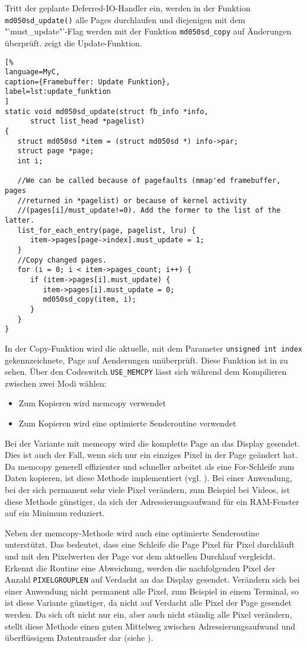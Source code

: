 Tritt der geplante Deferred-IO-Handler ein, werden in der Funktion \lstinline|md050sd_update()| alle Pages durchlaufen und diejenigen mit dem "'must\_update"'-Flag werden mit der Funktion \lstinline|md050sd_copy| auf Änderungen überprüft.
 zeigt die Update-Funktion.
\begin{lstlisting}[%
language=MyC,
caption={Framebuffer: Update Funktion},
label=lst:update_funktion
]
static void md050sd_update(struct fb_info *info,
      struct list_head *pagelist)
{
   struct md050sd *item = (struct md050sd *) info->par;
   struct page *page;
   int i;

   //We can be called because of pagefaults (mmap'ed framebuffer, pages
   //returned in *pagelist) or because of kernel activity
   //(pages[i]/must_update!=0). Add the former to the list of the latter.
   list_for_each_entry(page, pagelist, lru) {
      item->pages[page->index].must_update = 1;
   }
   //Copy changed pages.
   for (i = 0; i < item->pages_count; i++) {
      if (item->pages[i].must_update) {
         item->pages[i].must_update = 0;
         md050sd_copy(item, i);
      }
   }
}
\end{lstlisting}
In der Copy-Funktion wird die aktuelle, mit dem Parameter \lstinline|unsigned int index| gekennzeichnete, Page auf Aenderungen unüberprüft. Diese Funktion ist in  zu sehen. Über den Codeswitch \lstinline|USE_MEMCPY| lässt sich während dem Kompilieren zwischen zwei Modi wählen:
\begin{itemize}
	\item Zum Kopieren wird memcopy verwendet
	\item Zum Kopieren wird eine optimierte Senderoutine verwendet
\end{itemize}

Bei der Variante mit memcopy wird die komplette Page an das Display gesendet. Dies ist auch der Fall, wenn sich nur ein einziges Pixel in der Page geändert hat. Da memcopy generell effizienter und schneller arbeitet als eine For-Schleife zum Daten kopieren, ist diese Methode implementiert (vgl. \cite{Nadeau2012}). Bei einer Anwendung, bei der sich permanent sehr viele Pixel verändern, zum Beispiel bei Videos, ist diese Methode günstiger, da sich der Adressierungsaufwand für ein RAM-Fenster auf ein Minimum reduziert. 

Neben der memcopy-Methode wird auch eine optimierte Senderoutine unterstützt. Das bedeutet, dass eine Schleife die Page Pixel für Pixel durchläuft und mit den Pixelwerten der Page vor dem aktuellen Durchlauf vergleicht. Erkennt die Routine eine Abweichung, werden die nachfolgenden Pixel der Anzahl \lstinline|PIXELGROUPLEN| auf Verdacht an das Display gesendet. Verändern sich bei einer Anwendung nicht permanent alle Pixel, zum Beispiel in einem Terminal, so ist diese Variante günstiger, da nicht auf Verdacht alle Pixel der Page gesendet werden.
Da sich oft nicht nur ein, aber auch nicht ständig alle Pixel  verändern, stellt diese Methode einen guten Mittelweg zwischen Adressierungsaufwand und überflüssigem Datentransfer dar (siehe \cite{Schlegel2013a}). 


